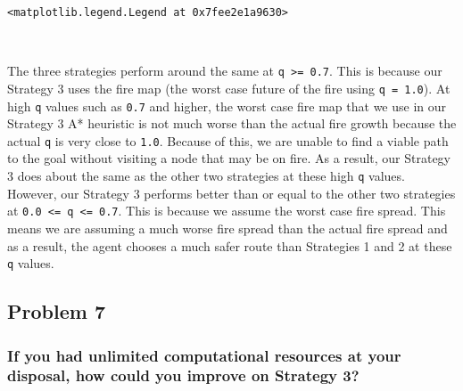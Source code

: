 \documentclass[11pt]{article}
\makeatletter
\newcommand{\boxspacing}{\kern\kvtcb@left@rule\kern\kvtcb@boxsep}
\newcommand{\prompt}[4]{
        {\ttfamily\llap{{\color{#2}[#3]:\hspace{3pt}#4}}\vspace{-\baselineskip}}
    }
\makeatother
\begin{document}
    
    \begin{Verbatim}[commandchars=\\\{\}]

    \end{Verbatim}

            \begin{tcolorbox}[breakable, size=fbox, boxrule=.5pt, pad at break*=1mm, opacityfill=0]
\prompt{Out}{outcolor}{ }{\boxspacing}
\begin{Verbatim}[commandchars=\\\{\}]
<matplotlib.legend.Legend at 0x7fee2e1a9630>
\end{Verbatim}
\end{tcolorbox}
        
    \begin{center}
    \end{center}
    { \hspace*{\fill} \\}
    
    The three strategies perform around the same at
\texttt{q\ \textgreater{}=\ 0.7}. This is because our Strategy 3 uses
the fire map (the worst case future of the fire using
\texttt{q\ =\ 1.0}). At high \texttt{q} values such as \texttt{0.7} and
higher, the worst case fire map that we use in our Strategy 3 A*
heuristic is not much worse than the actual fire growth because the
actual \texttt{q} is very close to \texttt{1.0}. Because of this, we are
unable to find a viable path to the goal without visiting a node that
may be on fire. As a result, our Strategy 3 does about the same as the
other two strategies at these high \texttt{q} values. However, our
Strategy 3 performs better than or equal to the other two strategies at
\texttt{0.0\ \textless{}=\ q\ \textless{}=\ 0.7}. This is because we
assume the worst case fire spread. This means we are assuming a much
worse fire spread than the actual fire spread and as a result, the agent
chooses a much safer route than Strategies 1 and 2 at these \texttt{q}
values.

    \hypertarget{problem-7}{%
\subsection{Problem 7}\label{problem-7}}

    \hypertarget{if-you-had-unlimited-computational-resources-at-your-disposal-how-could-you-improve-on-strategy-3}{%
\subsubsection{If you had unlimited computational resources at your
disposal, how could you improve on Strategy
3?}\label{if-you-had-unlimited-computational-resources-at-your-disposal-how-could-you-improve-on-strategy-3}}
\end{document}
